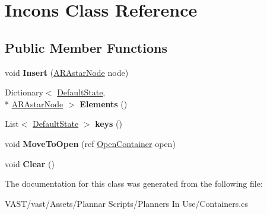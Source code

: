\hypertarget{class_incons}{\section{Incons Class Reference}
\label{class_incons}
}
\subsection*{Public Member Functions}
\begin{DoxyCompactItemize}
\item 
\hypertarget{class_incons_a599de106ff55f34789e0d5140eabfe48}{void {\bfseries Insert} (\hyperlink{class_a_r_astar_node}{A\-R\-Astar\-Node} node)}\label{class_incons_a599de106ff55f34789e0d5140eabfe48}

\item 
\hypertarget{class_incons_a728bdf34ed93795bcf20e77ff01ef23d}{Dictionary$<$ \hyperlink{class_default_state}{Default\-State}, \\*
\hyperlink{class_a_r_astar_node}{A\-R\-Astar\-Node} $>$ {\bfseries Elements} ()}\label{class_incons_a728bdf34ed93795bcf20e77ff01ef23d}

\item 
\hypertarget{class_incons_af233952cd9fa9a2c7478bc02c29e3aad}{List$<$ \hyperlink{class_default_state}{Default\-State} $>$ {\bfseries keys} ()}\label{class_incons_af233952cd9fa9a2c7478bc02c29e3aad}

\item 
\hypertarget{class_incons_aa9e20464feb57c967621d58319d88f5e}{void {\bfseries Move\-To\-Open} (ref \hyperlink{class_open_container}{Open\-Container} open)}\label{class_incons_aa9e20464feb57c967621d58319d88f5e}

\item 
\hypertarget{class_incons_a50eda8dae76cbdc9d30e4ecef8645a8b}{void {\bfseries Clear} ()}\label{class_incons_a50eda8dae76cbdc9d30e4ecef8645a8b}

\end{DoxyCompactItemize}


The documentation for this class was generated from the following file\-:\begin{DoxyCompactItemize}
\item 
V\-A\-S\-T/vast/\-Assets/\-Plannar Scripts/\-Planners In Use/Containers.\-cs\end{DoxyCompactItemize}
